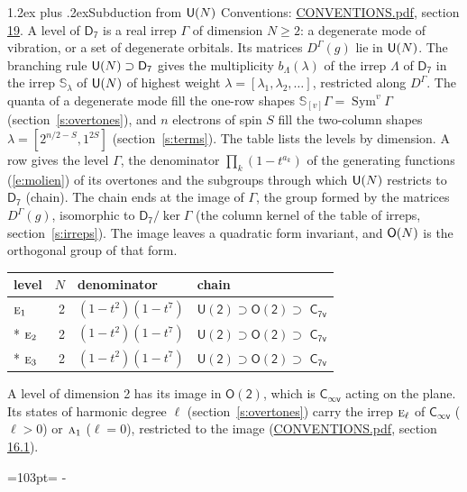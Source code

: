 \documentclass[10pt,a4paper]{article}
\makeatletter
\renewcommand\section{\@startsection{section}{1}{\z@}{-3ex plus -1ex minus -.2ex}%
  {1.2ex plus .2ex}{\normalfont\large\sffamily\bfseries\color{parttitle}}}
\newcommand{\needspace}[1]{\par\penalty-100\begingroup\dimen0=#1\relax\dimen2=\pagegoal
  \advance\dimen2-\pagetotal\ifdim\dimen0>\dimen2\relax\ifdim\dimen2>0pt\vfil\break\fi\fi
  \endgroup}
\numberwithin{equation}{section}
\newcommand{\grp}[1]{\mathsf{#1}}
\newcommand{\irr}[1]{\text{\normalfont\scshape #1}}
\newcommand{\repD}[1]{D^{#1}}
\newcommand{\schur}[1]{\mathbb{S}_{#1}}
\newcommand{\shape}[1]{[#1]}
\makeatother
\begin{document}
\section{Subduction from \texorpdfstring{$\grp{U(\mathnormal{N})}$}{U(N)}}\label{s:unitary}
Conventions: \href{../../CONVENTIONS.pdf}{CONVENTIONS.pdf}, section \href{../../CONVENTIONS.pdf\#conv.19}{19}.
\leavevmode\label{n:local.level.dimension}A level of $\grp{D_{7}}$ is a real irrep $\Gamma$ of dimension $N \ge 2$: a degenerate mode of vibration, or a set of degenerate orbitals. \label{n:group.unitary}Its matrices $\repD{\Gamma}(g)$ lie in $\grp{U(\mathnormal{N})}$. \label{n:irrep.schur}\label{n:shape.partition}\label{n:local.partition}\label{n:function.multiplicity.unitary}The branching rule $\grp{U(\mathnormal{N})} \supset \grp{D_{7}}$ gives the multiplicity $b_\Lambda(\lambda)$ of the irrep $\Lambda$ of $\grp{D_{7}}$ in the irrep $\schur{\lambda}$ of $\grp{U(\mathnormal{N})}$ of highest weight $\lambda = \shape{\lambda_1, \lambda_2, \dots}$, restricted along $\repD{\Gamma}$. \label{n:local.partition.power}\label{n:local.electrons}\label{n:local.spin}The quanta of a degenerate mode fill the one-row shapes $\schur{\shape{v}}\Gamma = \operatorname{Sym}^{v}\Gamma$ (section~\ref{s:overtones}), and $n$ electrons of spin $S$ fill the two-column shapes $\lambda = \shape{2^{n/2-S}, 1^{2S}}$ (section~\ref{s:terms}).
The table lists the levels by dimension. \label{n:head.level}\label{n:head.denominator}\label{n:index.overtone.denominator}\label{n:head.chain}A row gives the level $\Gamma$, the denominator $\prod_k (1 - t^{a_k})$ of the generating functions (\ref{e:molien}) of its overtones and the subgroups through which $\grp{U(\mathnormal{N})}$ restricts to $\grp{D_{7}}$ (chain). The chain ends at the image of $\Gamma$, the group formed by the matrices $\repD{\Gamma}(g)$, isomorphic to $\grp{D_{7}}/\ker\Gamma$ (the column kernel of the table of irreps, section~\ref{s:irreps}). The image leaves a quadratic form invariant, and $\grp{O(\mathnormal{N})}$ is the orthogonal group of that form.
{\small\begin{longtable}{@{}lrll@{}}\toprule
level & $N$ & denominator & chain\\\midrule\endhead
\bottomrule\endfoot\endlastfoot
$\irr{e}_{1}$ & 2 & $(1-t^{2})(1-t^{7})$ & $\grp{U(2)} \supset \grp{O(2)} \supset$ \href{C7v.pdf}{$\grp{C_{7v}}$}\\*
$\irr{e}_{2}$ & 2 & $(1-t^{2})(1-t^{7})$ & $\grp{U(2)} \supset \grp{O(2)} \supset$ \href{C7v.pdf}{$\grp{C_{7v}}$}\\*
$\irr{e}_{3}$ & 2 & $(1-t^{2})(1-t^{7})$ & $\grp{U(2)} \supset \grp{O(2)} \supset$ \href{C7v.pdf}{$\grp{C_{7v}}$}\\
\bottomrule\end{longtable}}
A level of dimension 2 has its image in $\grp{O(2)}$, which is \href{Cinfv.pdf}{$\grp{C_{\infty v}}$} acting on the plane. \label{n:index.harmonic.degree}Its states of harmonic degree $\ell$ (section~\ref{s:overtones}) carry the irrep $\irr{e}_{\ell}$ of \href{Cinfv.pdf}{$\grp{C_{\infty v}}$} ($\ell > 0$) or $\irr{a}_{1}$ ($\ell = 0$), restricted to the image (\href{../../CONVENTIONS.pdf}{CONVENTIONS.pdf}, section \href{../../CONVENTIONS.pdf\#conv.16.1}{16.1}).
\needspace{103pt}
\end{document}
